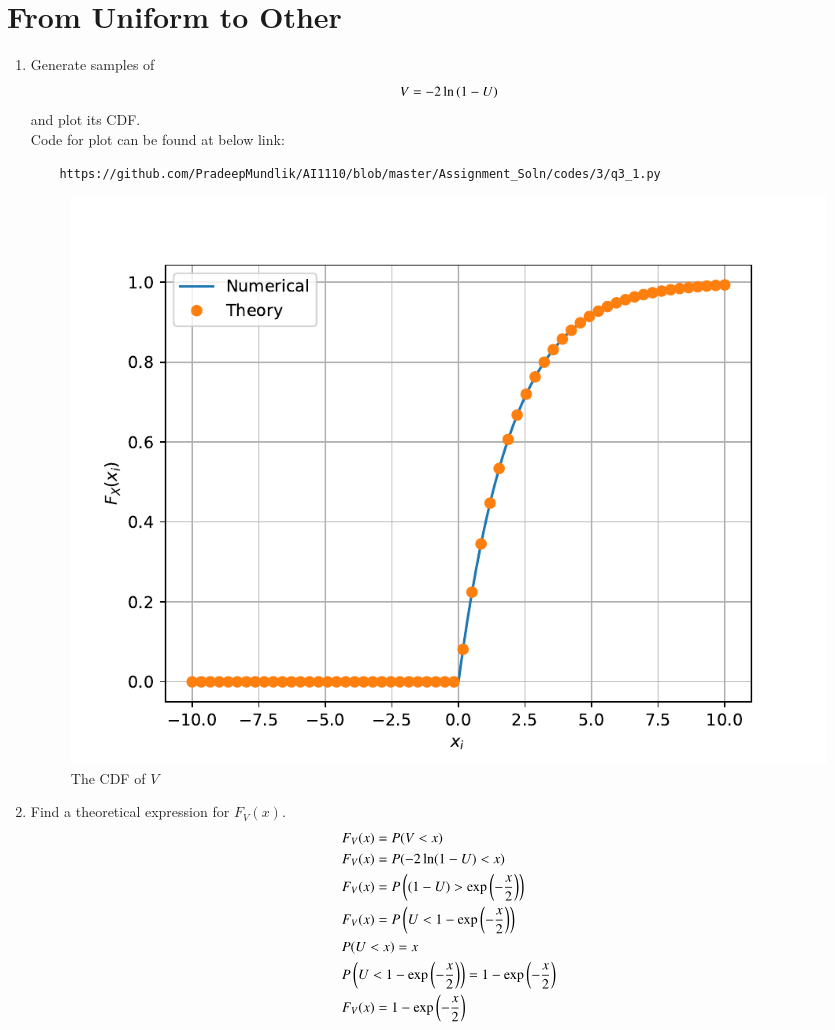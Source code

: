 \documentclass[journal,12pt,twocolumn]{IEEEtran}
\renewcommand\thesection{\arabic{section}}
\begin{document}
\section{From Uniform to Other}
\begin{enumerate}[label=\thesection.\arabic*
,ref=\thesection.\theenumi]
%
\item
Generate samples of 
%
\begin{equation}
V = -2\ln\left(1-U\right)
\end{equation}
%
and plot its CDF. \\
\solution 
Code for plot can be found at below link:
\begin{lstlisting}
	https://github.com/PradeepMundlik/AI1110/blob/master/Assignment_Soln/codes/3/q3_1.py
\end{lstlisting}
\begin{figure}[h]
	\centering
	\includegraphics[width=\columnwidth]{figs/3/q3_1.pdf}
	\caption{The CDF of $V$}
	\label{fig:cdf_v}
	\end{figure}
\item Find a theoretical expression for $F_V(x)$. \\
\solution 
\begin{align}
	&F_V(x) = P(V < x) \\
	&F_V(x) = P(-2 \ln(1-U) < x) \\
	&F_V(x) = P\left((1-U) > \exp\left(-\frac{x}{2}\right)\right) \\
	&F_V(x) = P\left(U < 1 - \exp\left(-\frac{x}{2}\right)\right) \\
	&P(U < x) = x \\
	&P\left(U < 1 - \exp\left(-\frac{x}{2}\right)\right) = 1 - \exp\left(-\frac{x}{2}\right) \\
	&F_V(x) = 1 - \exp\left(-\frac{x}{2}\right)
\end{align}

%
\end{enumerate}
\end{document}
